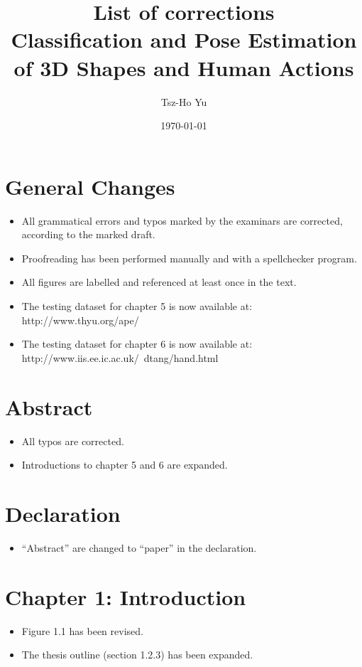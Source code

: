 \documentclass[10pt, a4paper]{article}
\title{List of corrections \\ {\large Classification and Pose Estimation of 3D Shapes and Human Actions} }
\author{Tsz-Ho Yu}
\date{\today}
\begin{document}
\maketitle

\section{General Changes}
\begin{itemize}
\item All grammatical errors and typos marked by the examinars are corrected, according to the marked draft.
\item Proofreading has been performed manually and with a spellchecker program.
\item All figures are labelled and referenced at least once in the text.
\item The testing dataset for chapter 5 is now available at: http://www.thyu.org/ape/
\item The testing dataset for chapter 6 is now available at: http://www.iis.ee.ic.ac.uk/~dtang/hand.html
\end{itemize}

\section{Abstract}
\begin{itemize}
\item All typos are corrected.
\item Introductions to chapter 5 and 6 are expanded.
\end{itemize}

\section{Declaration}
\begin{itemize}
\item ``Abstract'' are changed to ``paper'' in the declaration.
\end{itemize}

\section{Chapter 1: Introduction}
\begin{itemize}
\item Figure 1.1 has been revised.
\item The thesis outline (section 1.2.3) has been expanded.
\end{itemize}
\end{document}
